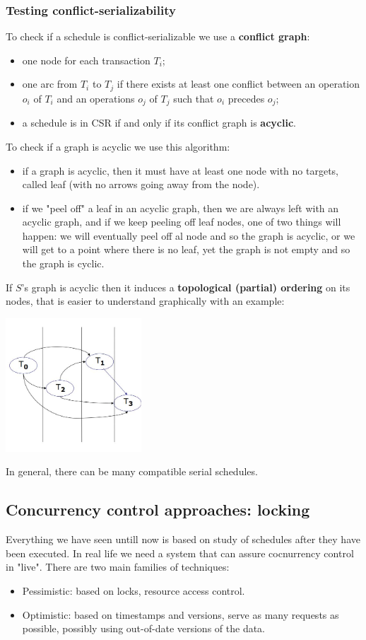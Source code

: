\subsubsection{Testing conflict-serializability}
To check if a schedule is conflict-serializable we use a \textbf{conflict graph}:
\begin{itemize}
    \item one node for each transaction $T_i$;
    \item one arc from $T_i$ to $T_j$ if there exists at least one conflict between an operation $o_i$ of $T_i$ and an operations $o_j$ of $T_j$ such that $o_i$ precedes $o_j$;
    \item a schedule is in CSR if and only if its conflict graph is \textbf{acyclic}.
\end{itemize}
To check if a graph is acyclic we use this algorithm:
\begin{itemize}
    \item if a graph is acyclic, then it must have at least one node with no targets, called leaf (with no arrows going away from the node).
    \item if we "peel off" a leaf in an acyclic graph, then we are always left with an acyclic graph, and if we keep peeling off leaf nodes, one of two things will happen: we will eventually peel off al node and so the graph is acyclic, or we will get to a point where there is no leaf, yet the graph is not empty and so the graph is cyclic.
\end{itemize}
If $S$’s graph is acyclic then it induces a \textbf{topological (partial) ordering} on its nodes, that is easier to understand graphically with an example:
\begin{center}
    \includegraphics[height=5cm]{../arguments/topologicalpartialorderingCSR.JPG}
\end{center}
In general, there can be many compatible serial schedules.
\subsection{Concurrency control approaches: locking}
Everything we have seen untill now is based on study of schedules after they have been executed. In real life we need a system that can assure cocnurrency control in "live".\newline
There are two main families of techniques:
\begin{itemize}
    \item Pessimistic: based on locks, resource access control.
    \item Optimistic: based on timestamps and versions, serve as many requests as possible, possibly using out-of-date versions of the data.
\end{itemize}

